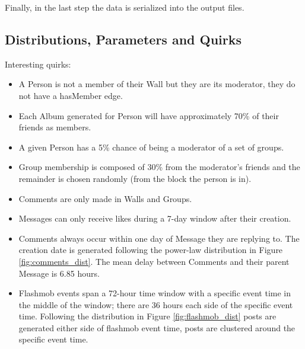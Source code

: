 Finally, in the last step the data is serialized into the output files.

\subsection{Distributions, Parameters and Quirks}
\label{sec:distr-param}

Interesting quirks:
\begin{itemize}
\item A Person is not a member of their Wall but they are its moderator, they do not have a hasMember edge.
\item Each Album generated for Person will have approximately 70\% of their friends as members.
\item A given Person has a 5\% chance of being a moderator of a set of groups.
\item Group membership is composed of 30\% from the moderator's friends and the remainder is chosen randomly (from the block the person is in).
\item Comments are only made in Walls and Groups.
\item Messages can only receive likes during a 7-day window after their creation.
\item Comments always occur within one day of Message they are replying to. The creation date is generated following the power-law distribution in Figure \ref{fig:comments_dist}. The mean delay between Comments and their parent Message is 6.85 hours.
\item Flashmob events span a 72-hour time window with a specific event time in the middle of the window; there are 36 hours each side of the specific event time. Following the distribution in Figure \ref{fig:flashmob_dist} posts are generated either side of flashmob event time, posts are clustered around the specific event time.
\end{itemize}

